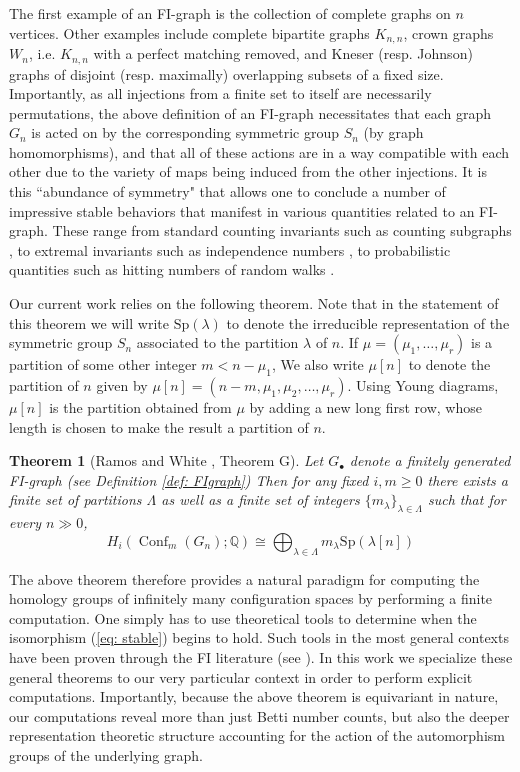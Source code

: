 \documentclass[12pt]{amsart}
\newtheorem{thm}{Theorem}[section]
\theoremstyle{definition}
\newcommand{\Q}{\mathbb{Q}}
\newcommand{\conf}{\operatorname{Conf}}
\newcommand{\Sp}{\mathrm{Sp}}
\begin{document}
The first example of an FI-graph is the collection of complete graphs on $n$ vertices. %
Other examples include complete bipartite graphs $K_{n,n}$, crown graphs $W_n$, i.e. $K_{n,n}$ with a perfect matching removed, and Kneser (resp. Johnson) graphs of disjoint (resp. maximally) overlapping subsets of a fixed size. Importantly, as all injections from a finite set to itself are necessarily permutations, the above definition of an FI-graph necessitates that each graph $G_n$ is acted on by the corresponding symmetric group $S_n$ (by graph homomorphisms), and that all of these actions are in a way compatible with each other due to the variety of maps being induced from the other injections. It is this ``abundance of symmetry" that allows one to conclude a number of impressive stable behaviors that manifest in various quantities related to an FI-graph. These range from standard counting invariants such as counting subgraphs \cite{RW}, to extremal invariants such as independence numbers \cite{GR}, to probabilistic quantities such as hitting numbers of random walks \cite{RW2}.

Our current work relies on the following theorem.
Note that in the statement of this theorem we will write $\Sp(\lambda)$ to denote the irreducible representation of the symmetric group $S_n$ associated to the partition $\lambda$ of $n$. If $\mu = (\mu_1,\ldots,\mu_r)$ is a partition of some other integer $m < n - \mu_1$, We also write $\mu[n]$ to denote the partition of $n$ given by $\mu[n] = (n-m,\mu_1,\mu_2,\ldots,\mu_r)$. Using Young diagrams, $\mu[n]$ is the partition obtained from $\mu$ by adding a new long first row, whose length is chosen to make the result a partition of $n$.

\begin{thm}[Ramos and White \cite{RW}, Theorem G]\label{thm: mainTech}
    Let $G_\bullet$ denote a finitely generated FI-graph (see Definition \ref{def: FIgraph}) Then for any fixed $i,m \geq 0$ there exists a finite set of partitions $\Lambda$ as well as a finite set of integers $\{m_\lambda\}_{\lambda \in \Lambda}$ such that for every $n \gg 0$,
    \[
    H_i(\conf_m(G_n);\Q) \cong \bigoplus_{\lambda \in \Lambda}m_\lambda \Sp(\lambda[n]) \label{eq: stable}
    \]
\end{thm}

The above theorem therefore provides a natural paradigm for computing the homology groups of infinitely many configuration spaces by performing a finite computation. One simply has to use theoretical tools to determine when the isomorphism (\ref{eq: stable}) begins to hold. Such tools in the most general contexts have been proven through the FI literature (see \cite{CEF,LR,CMNR,CMNR}). In this work we specialize these general theorems to our very particular context in order to perform explicit computations. Importantly, because the above theorem is equivariant in nature, our computations reveal more than just Betti number counts, but also the deeper representation theoretic structure accounting for the action of the automorphism groups of the underlying graph.
\end{document}
